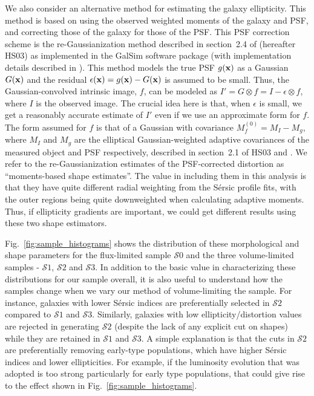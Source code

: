\documentclass[twocolumn,useAMS,usenatbib]{mn2e}
\newcommand{\sersic}{S\'{e}rsic }
\newcommand{\s}{\ensuremath{\mathcal{S}}}
\begin{document}
We also consider an alternative method for estimating the galaxy
ellipticity.  This method is based on using the observed weighted
moments of the galaxy and PSF, and correcting those of the galaxy for
those of the PSF.  This PSF correction scheme is the
re-Gaussianization method described in section~2.4 of \cite{HS03}
(hereafter HS03) as implemented in the {\sc GalSim} software package
(with implementation details described in \citealt{2014arXiv1407.7676R}).
This method models the true PSF $g({\bf x})$ as a Gaussian $G({\bf x})$ and the residual $\epsilon({\bf x}) = g({\bf x}) - G({\bf x})$ is assumed to be small. Thus, the Gaussian-convolved
intrinsic image, $f$, can be modeled as $I' = G\otimes f = I - \epsilon \otimes f$, where $I$ is the observed image. The crucial idea here is that, when $\epsilon$ is small, we get a reasonably accurate
estimate of $I'$ even if we use an approximate form for $f$. The form
assumed for $f$ is that of a Gaussian with covariance $M_f^{(0)} = M_I
- M_g$, where $M_I$ and $M_g$ are the elliptical Gaussian-weighted adaptive
covariances of the measured object and PSF respectively, described in
section~2.1 of HS03 and \cite{BJ02}. We refer to the
re-Gaussianization estimates of the PSF-corrected distortion as
``moments-based shape estimates''.  The value in including them in
this analysis is that they have quite different radial weighting from
the \sersic profile fits, with the outer regions being quite
downweighted when calculating adaptive moments.  Thus, if ellipticity
gradients are important, we could get different results using these
two shape estimators.

Fig.~\ref{fig:sample_histograms} shows the distribution of these morphological and shape parameters for the flux-limited sample \s$0$ and the three
volume-limited samples - \s$1$, \s$2$ and \s$3$. In addition to the
basic value in characterizing these distributions for our sample
overall, it is also useful to understand how the samples change when
we vary our method of volume-limiting the sample.
For instance, galaxies with lower \sersic indices are preferentially
selected in \s$2$ compared to \s$1$ and \s$3$. Similarly, galaxies
with low ellipticity/distortion values 
are rejected in generating \s$2$ (despite the lack of any explicit
cut on shapes) while they are retained in
\s$1$ and \s$3$.  A simple explanation is that the cuts in \s$2$ are
preferentially removing early-type populations, which have higher
\sersic indices and lower ellipticities.  For example, if the
luminosity evolution that was adopted is too strong particularly for
early type populations, that could give rise to the effect shown in
Fig.~\ref{fig:sample_histograms}.
\end{document}
